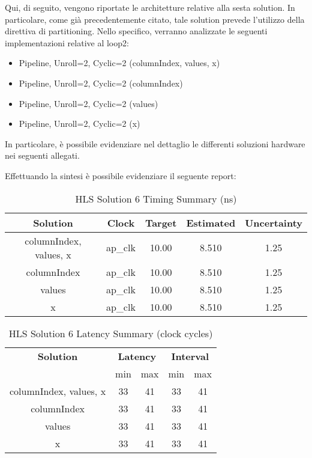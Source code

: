 Qui, di seguito, vengono riportate le architetture relative alla sesta solution. In particolare, come già precedentemente citato, tale solution prevede l'utilizzo della direttiva di partitioning. Nello specifico, verranno analizzate le seguenti implementazioni relative al loop2:
\begin{itemize}
	\item Pipeline, Unroll=2, Cyclic=2 (columnIndex, values, x)
	\item Pipeline, Unroll=2, Cyclic=2 (columnIndex)
	\item Pipeline, Unroll=2, Cyclic=2 (values)
	\item Pipeline, Unroll=2, Cyclic=2 (x)
\end{itemize}

In particolare, è possibile evidenziare nel dettaglio le differenti soluzioni hardware nei seguenti allegati.





Effettuando la sintesi è possibile evidenziare il seguente report:\\

\begin{table}[H]
	\centering
	\begin{tabular}{|c|c|c|c|c|}
		\hline
		\textbf{Solution} & \textbf{Clock} & \textbf{Target} & \textbf{Estimated} & \textbf{Uncertainty} \\
		\hline
		columnIndex, values, x & ap\_clk & 10.00 & 8.510 & 1.25 \\
		\hline
		columnIndex & ap\_clk & 10.00 & 8.510 & 1.25 \\
		\hline
		values & ap\_clk & 10.00 & 8.510 & 1.25 \\
		\hline
		x & ap\_clk & 10.00 & 8.510 & 1.25 \\
		\hline
	\end{tabular}
	\caption{HLS Solution 6 Timing Summary (ns)}
	\label{tab:hls-solution-6-timing-summary}
\end{table}

\begin{table}[H]
	\centering
	\begin{tabular}{|c|c|c|c|c|}
		\hline
		\multicolumn{1}{|c|}{\textbf{Solution}} & \multicolumn{2}{|c|}{\textbf{Latency}} & \multicolumn{2}{|c|}{\textbf{Interval}} \\
		& min & max & min & max \\
		\hline
		columnIndex, values, x & 33 & 41 & 33 & 41 \\
		\hline
		columnIndex & 33 & 41 & 33 & 41 \\
		\hline
		values & 33 & 41 & 33 & 41 \\
		\hline
		x & 33 & 41 & 33 & 41 \\
		\hline
	\end{tabular}
	\caption{HLS Solution 6 Latency Summary (clock cycles)}
	\label{tab:hls-solution-6-latency-summary}
\end{table}

